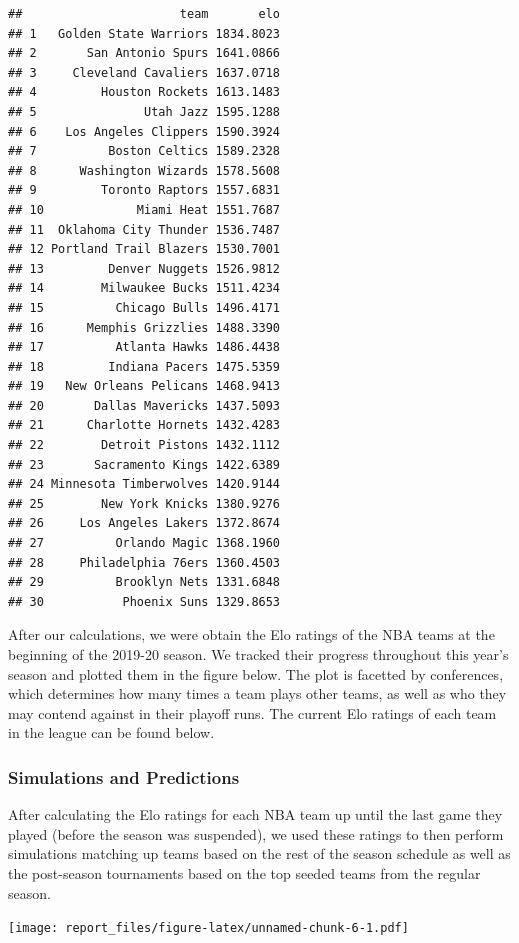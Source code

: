 \documentclass[]{article}
\begin{document}
\begin{verbatim}
##                      team       elo
## 1   Golden State Warriors 1834.8023
## 2       San Antonio Spurs 1641.0866
## 3     Cleveland Cavaliers 1637.0718
## 4         Houston Rockets 1613.1483
## 5               Utah Jazz 1595.1288
## 6    Los Angeles Clippers 1590.3924
## 7          Boston Celtics 1589.2328
## 8      Washington Wizards 1578.5608
## 9         Toronto Raptors 1557.6831
## 10             Miami Heat 1551.7687
## 11  Oklahoma City Thunder 1536.7487
## 12 Portland Trail Blazers 1530.7001
## 13         Denver Nuggets 1526.9812
## 14        Milwaukee Bucks 1511.4234
## 15          Chicago Bulls 1496.4171
## 16      Memphis Grizzlies 1488.3390
## 17          Atlanta Hawks 1486.4438
## 18         Indiana Pacers 1475.5359
## 19   New Orleans Pelicans 1468.9413
## 20       Dallas Mavericks 1437.5093
## 21      Charlotte Hornets 1432.4283
## 22        Detroit Pistons 1432.1112
## 23       Sacramento Kings 1422.6389
## 24 Minnesota Timberwolves 1420.9144
## 25        New York Knicks 1380.9276
## 26     Los Angeles Lakers 1372.8674
## 27          Orlando Magic 1368.1960
## 28     Philadelphia 76ers 1360.4503
## 29          Brooklyn Nets 1331.6848
## 30           Phoenix Suns 1329.8653
\end{verbatim}

After our calculations, we were obtain the Elo ratings of the NBA teams
at the beginning of the 2019-20 season. We tracked their progress
throughout this year's season and plotted them in the figure below. The
plot is facetted by conferences, which determines how many times a team
plays other teams, as well as who they may contend against in their
playoff runs. The current Elo ratings of each team in the league can be
found below.

\hypertarget{simulations-and-predictions}{%
\subsubsection{Simulations and
Predictions}\label{simulations-and-predictions}}

After calculating the Elo ratings for each NBA team up until the last
game they played (before the season was suspended), we used these
ratings to then perform simulations matching up teams based on the rest
of the season schedule as well as the post-season tournaments based on
the top seeded teams from the regular season.

\texttt{[image: report\_files/figure-latex/unnamed-chunk-6-1.pdf]}
\end{document}
